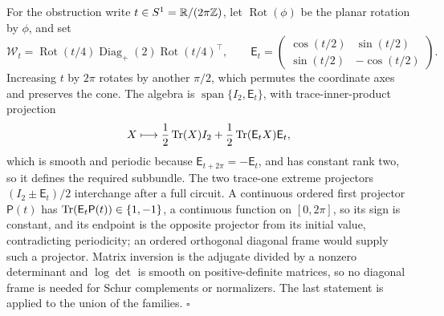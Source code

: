 For the obstruction write \(t\in S^1=\mathbb R/(2\pi\mathbb Z)\), let \(\operatorname{Rot}(\phi)\) be the
planar rotation by \(\phi\), and set
\begin{equation}
\mathscr W_t=
\operatorname{Rot}(t/4)\operatorname{Diag}_+(2)
\operatorname{Rot}(t/4)^\top,\qquad
\mathsf E_t=
\begin{pmatrix}
\cos(t/2)&\sin(t/2)\\
\sin(t/2)&-\cos(t/2)
\end{pmatrix}.
\label{eq:cg-kron-circle-cone}
\end{equation}
Increasing \(t\) by \(2\pi\) rotates by another \(\pi/2\), which permutes the coordinate axes and
preserves the cone. The algebra is \(\operatorname{span}\{I_2,\mathsf E_t\}\), with trace-inner-product
projection
\begin{equation}
X\longmapsto
\frac12\operatorname{Tr}(X)I_2+\frac12\operatorname{Tr}(\mathsf E_tX)\mathsf E_t,
\label{eq:cg-kron-circle-algebra-projector}
\end{equation}
which is smooth and periodic because \(\mathsf E_{t+2\pi}=-\mathsf E_t\), and has constant rank two,
so it defines the required subbundle. The two trace-one extreme projectors
\((I_2\pm\mathsf E_t)/2\) interchange after a full circuit. A continuous ordered first projector
\(\mathsf P(t)\) has \(\operatorname{Tr}(\mathsf E_t\mathsf P(t))\in\{1,-1\}\), a continuous function on
\([0,2\pi]\), so its sign is constant, and its endpoint is the opposite projector from its initial
value, contradicting periodicity; an ordered orthogonal diagonal frame would supply such a projector.
Matrix inversion is the adjugate divided by a nonzero determinant and \(\log\det\) is smooth on
positive-definite matrices, so no diagonal frame is needed for Schur complements or normalizers. The
last statement is  applied to the union of the
families. \hfill$\square$
